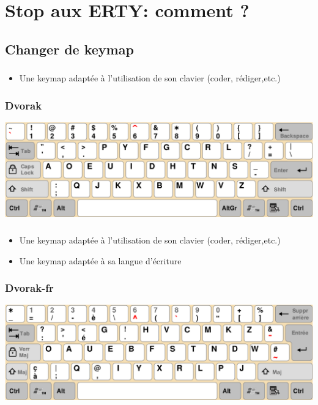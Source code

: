 \documentclass[c,12pt]{beamer}
\begin{document}
\section{Stop aux ERTY: comment ?}
\subsection{Changer de keymap}

\begin{frame}
	\frametitle{\subsecname}
	\begin{itemize}
		\item{Une keymap adaptée à l'utilisation de son clavier (coder,
			rédiger,etc.)}
	\end{itemize}
\end{frame}

\begin{frame}
	\frametitle{Dvorak}
	\begin{center}
		\includegraphics[scale=0.26]{Dvorak_.png}
	\end{center}
\end{frame}

\begin{frame}
	\frametitle{\subsecname}
	\begin{itemize}
		\item<1->{Une keymap adaptée à l'utilisation de son clavier (coder,
			rédiger,etc.)}
		\item<2->{Une keymap adaptée à sa langue d'écriture}
	\end{itemize}
\end{frame}

\begin{frame}
	\frametitle{Dvorak-fr}
	\begin{center}
		\includegraphics[scale=0.26]{Dvorak-fr.png}
	\end{center}
\end{frame}
\end{document}
